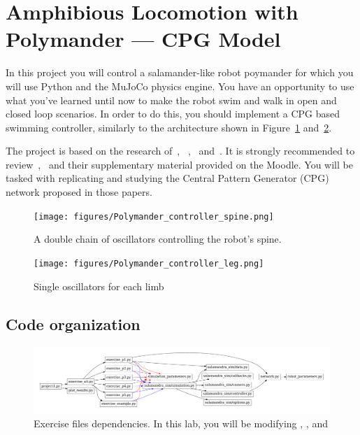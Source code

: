 \documentclass{cmc}
\begin{document}
\section*{Amphibious Locomotion with Polymander --- CPG Model}\label{sec:exploring-swimming}

In this project you will control a salamander-like robot poymander
 for which you will use Python and the MuJoCo physics
engine. You have an opportunity to use what you've learned until
now to make the robot swim and walk in open and closed loop scenarios.
In order to do this, you should implement a CPG based swimming controller,
similarly to the architecture shown in Figure~\ref{fig:controller-model-spine} and~\ref{fig:controller-model-leg}.

The project is based on the research of~\cite{Crespi2013},
~\cite{Karakasiliotis2013},~\cite{ijspeert2007swimming}
and~\cite{thandiackal2021emergence}. It is strongly recommended to
review~\cite{ijspeert2007swimming},~\cite{owaki2013simple} and their
supplementary material provided on the Moodle.
You will be tasked with replicating and studying the
Central Pattern Generator (CPG) network proposed in those papers.

\begin{figure}[H]
  \centering
  \texttt{[image: figures/Polymander\_controller\_spine.png]}
  \caption[Controller model spine]{A double chain of oscillators controlling
    the robot's spine.}\label{fig:controller-model-spine}
\end{figure}

\begin{figure}[H]
  \centering
  \texttt{[image: figures/Polymander\_controller\_leg.png]}
  \caption[Controller model limbs]{Single oscillators for each limb}
  \label{fig:controller-model-leg}
\end{figure}




\subsection*{Code organization}\label{subsec:code}

\begin{figure}[ht]
  \centering \includegraphics[width=1.0\textwidth]{figures/files}
  \caption{\label{fig:files} Exercise files dependencies. In this lab, you will
    be modifying , ,
     and }
\end{figure}
\end{document}
